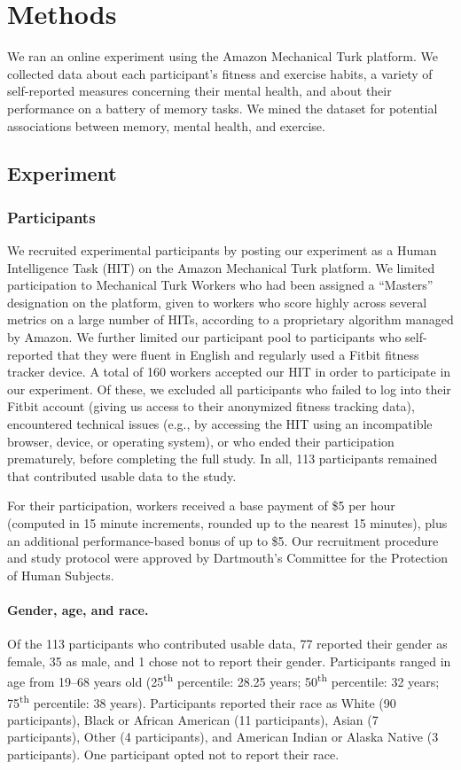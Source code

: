\documentclass[10pt]{article}
\begin{document}
    \section*{Methods}

    We ran an online experiment using the Amazon Mechanical Turk
    platform.  We collected data about each participant's fitness and
    exercise habits, a variety of self-reported measures concerning their
    mental health, and about their performance on a battery of memory
    tasks.  We mined the dataset for potential associations between
    memory, mental health, and exercise.

    
    
\subsection*{Experiment}
\subsubsection*{Participants}
We recruited experimental participants by posting our experiment as a
Human Intelligence Task (HIT) on the Amazon Mechanical Turk platform.
We limited participation to Mechanical Turk Workers who had been
assigned a ``Masters'' designation on the platform, given to workers
who score highly across several metrics on a large number of HITs,
according to a proprietary algorithm managed by Amazon.  We further
limited our participant pool to participants who self-reported that
they were fluent in English and regularly used a Fitbit fitness
tracker device.  A total of 160 workers accepted our
HIT in order to participate in our experiment.  Of these, we excluded all
participants who failed to log into their Fitbit account (giving us
access to their anonymized fitness tracking data), encountered
technical issues (e.g., by accessing the HIT using an incompatible browser, device, or
operating system), or who ended their participation prematurely,
before completing the full study.  In all, 113 participants remained
that contributed usable data to the study.

For their participation, workers received a base payment of \$5 per hour (computed in 15
minute increments, rounded up to the nearest 15 minutes), plus an
additional performance-based bonus of up to \$5.  Our recruitment
procedure and study protocol
were approved by Dartmouth's Committee for the Protection of Human Subjects.

\paragraph{Gender, age, and race.}
Of the 113 participants who contributed usable data, 77 reported their gender as female, 35 as
male, and 1 chose not to report their gender.  Participants ranged in
age from 19--68 years old (25\textsuperscript{th} percentile: 28.25
years; 50\textsuperscript{th} percentile: 32 years;
75\textsuperscript{th} percentile: 38 years).  Participants reported
their race as White (90 participants), Black or African American (11
participants), Asian (7 participants), Other (4 participants), and
American Indian or Alaska Native (3 participants).  One participant
opted not to report their race.
\end{document}
